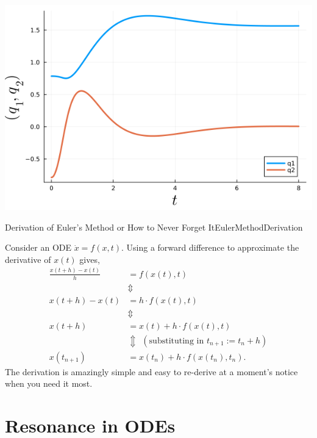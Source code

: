 \begin{enumerate}
\begin{center}
    \includegraphics[width=0.6\columnwidth]{graphics/Chap09/2LinkManipulatorSimulationClosedLoopStatesEuler.png}
\end{center}




\end{enumerate} 

\bigskip

\begin{factColor}{Derivation of Euler's Method or How to Never Forget It}{EulerMethodDerivation}

Consider an ODE $\dot{x} = f(x, t)$. Using a forward difference to approximate the derivative of $x(t)$ gives,
\begin{align*}
    \frac{x(t+ h) -x(t)}{h} &= f(x(t),t) \\
    & \Updownarrow \\
    x(t+h) - x(t) &= h \cdot f(x(t), t) \\
     & \Updownarrow \\
     x(t+h) & = x(t) +  h \cdot f(x(t), t) \\
          & \Updownarrow  ~~(\text{substituting in } t_{n+1} :=t_n+h)\\
     x(t_{n+1}) & = x(t_n) +  h \cdot f(x(t_n), t_n).
\end{align*}
The derivation is amazingly simple and easy to re-derive at a moment's notice when you need it most.
    
\end{factColor}

\section{Resonance in ODEs}



